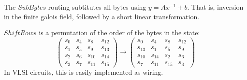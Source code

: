 The $SubBytes$ routing subtitutes all bytes using $y = A x^{-1} + b$.
That is, inversion in the finite galois field, followed by a short
linear transformation.

$ShiftRows$ is a permutation of the order of the bytes in the state:
\begin{equation}
  \begin{pmatrix}
    s_0 & s_4 & s_8    & s_{12} \\
    s_1 & s_5 & s_9    & s_{13} \\
    s_2 & s_6 & s_{10} & s_{14} \\
    s_3 & s_7 & s_{11} & s_{15}
  \end{pmatrix} 
  \rightarrow
  \begin{pmatrix}
    s_0    & s_4    & s_8    & s_{12} \\
    s_{13} & s_1    & s_5    & s_9 \\
    s_{10} & s_{14} & s_2    & s_6 \\
    s_7    & s_{11} & s_{15} & s_3    
    \end{pmatrix}
\end{equation}
In VLSI circuits, this is easily implemented as wiring.


